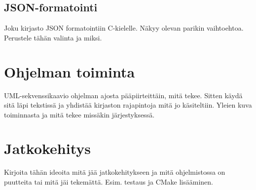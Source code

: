 \subsection{JSON-formatointi}
\begin{it}
	Joku kirjasto JSON formatointiin C-kielelle. Näkyy olevan parikin vaihtoehtoa. Perustele tähän valinta ja miksi.
\end{it}


\section{Ohjelman toiminta}
\begin{it}
	UML-sekvenssikaavio ohjelman ajosta pääpiirteittäin, mitä tekee. Sitten käydä sitä läpi tekstissä ja yhdistää kirjaston rajapintoja mitä jo käsiteltiin. Yleien kuva toiminnasta ja mitä tekee missäkin järjestyksessä.
\end{it}


\section{Jatkokehitys}
\begin{it}
	Kirjoita tähän ideoita mitä jää jatkokehitykseen ja mitä ohjelmistossa on puutteita tai mitä jäi tekemättä. Esim. testaus ja CMake lisääminen.
\end{it}